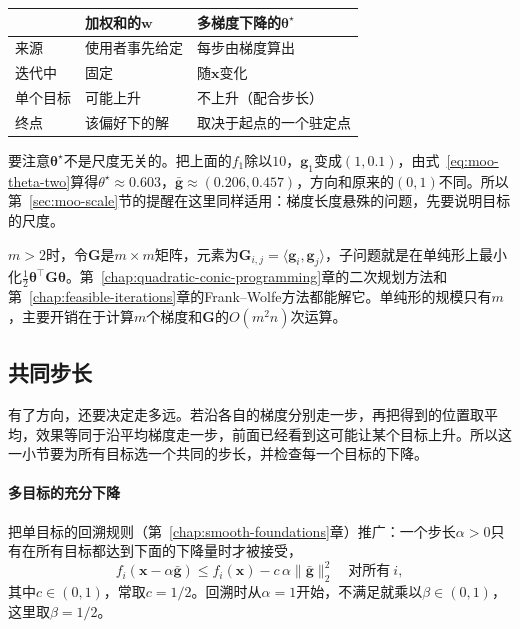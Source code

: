 \begin{BookInlineTable}
  \centering
  \caption{固定加权与多梯度下降中的权重。}
  \label{tab:moo-weights}
  \begin{tabular}{@{}lll@{}}
    \toprule
     & 加权和的$\bm{w}$ & 多梯度下降的$\bm{\theta}^\star$\\
    \midrule
    来源 & 使用者事先给定 & 每步由梯度算出\\
    迭代中 & 固定 & 随$\bm{x}$变化\\
    单个目标 & 可能上升 & 不上升（配合步长）\\
    终点 & 该偏好下的解 & 取决于起点的一个驻定点\\
    \bottomrule
  \end{tabular}
\end{BookInlineTable}

要注意$\bm{\theta}^\star$不是尺度无关的。把上面的$f_1$除以$10$，$\bm{g}_1$变成$(1,0.1)$，由式~\eqref{eq:moo-theta-two}算得$\theta^\star\approx0.603$，$\bar{\bm{g}}\approx(0.206,0.457)$，方向和原来的$(0,1)$不同。所以第~\ref{sec:moo-scale}节的提醒在这里同样适用：梯度长度悬殊的问题，先要说明目标的尺度。

$m>2$时，令$\bm{G}$是$m\times m$矩阵，元素为$\bm{G}_{i,j}=\langle\bm{g}_i,\bm{g}_j\rangle$，子问题就是在单纯形上最小化$\frac12\bm{\theta}^\top\bm{G}\bm{\theta}$。第~\ref{chap:quadratic-conic-programming}章的二次规划方法和第~\ref{chap:feasible-iterations}章的Frank--Wolfe方法都能解它。单纯形的规模只有$m$，主要开销在于计算$m$个梯度和$\bm{G}$的$O(m^2n)$次运算。

\subsection{共同步长}
\label{sec:moo-common-step}

有了方向，还要决定走多远。若沿各自的梯度分别走一步，再把得到的位置取平均，效果等同于沿平均梯度走一步，前面已经看到这可能让某个目标上升。所以这一小节要为所有目标选一个共同的步长，并检查每一个目标的下降。

\paragraph{多目标的充分下降}
把单目标的回溯规则（第~\ref{chap:smooth-foundations}章）推广：一个步长$\alpha>0$只有在所有目标都达到下面的下降量时才被接受，
\begin{equation}
 f_i(\bm{x}-\alpha\bar{\bm{g}})\leq f_i(\bm{x})-c\,\alpha\lVert\bar{\bm{g}}\rVert_2^2\quad\text{对所有}\ i,
 \label{eq:moo-armijo}
\end{equation}
其中$c\in(0,1)$，常取$c=1/2$。回溯时从$\alpha=1$开始，不满足就乘以$\beta\in(0,1)$，这里取$\beta=1/2$。

